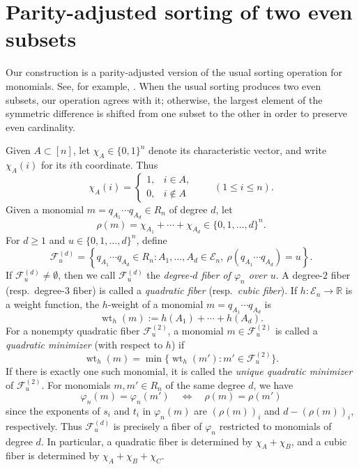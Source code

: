 \documentclass[11pt]{amsart}
\theoremstyle{definition}
\newcommand{\En}{\mathcal E_n}
\newcommand{\wt}{\operatorname{wt}}
\numberwithin{equation}{section}
\begin{document}
\section{Parity-adjusted sorting of two even subsets}

Our construction is a parity-adjusted version of the usual sorting
operation for monomials.
See, for example,
\cite[Theorem~14.2]{Sturmfels1996}.
When the usual sorting produces two even subsets, our operation agrees
with it; otherwise, the largest element of the symmetric difference is
shifted from one subset to the other in order to preserve even cardinality.

Given $A\subset[n]$, let $\chi_A\in\{0,1\}^n$ denote its
characteristic vector, and write $\chi_A(i)$ for its $i$th coordinate.
Thus
\[
 \chi_A(i)=
 \begin{cases}
 1,& i\in A,\\
 0,& i\notin A
 \end{cases}
 \qquad(1\le i\le n).
\]
Given a monomial $m=q_{A_1}\cdots q_{A_d} \in R_n$ of degree $d$, let
\[
\rho(m)=\chi_{A_1}+\cdots+\chi_{A_d}
\in\{0,1,\dots,d\}^n.
\]
For $d\ge1$ and $u\in\{0,1,\dots,d\}^n$, define
\[
\mathcal F_u^{(d)}
=
\left\{
q_{A_1}\cdots q_{A_d} \in R_n
:
A_1,\ldots,A_d\in\En,\ 
\rho(q_{A_1}\cdots q_{A_d})=u
\right\}.
\]
If $\mathcal F_u^{(d)}\neq\emptyset$, then we call
$\mathcal F_u^{(d)}$ the \emph{degree-$d$ fiber of $\varphi_n$ over $u$}.
A degree-$2$ fiber (resp.~degree-$3$ fiber) is called a
\emph{quadratic fiber} (resp.~\emph{cubic fiber}).
If $h:\En\to\mathbb R$ is a weight function, the $h$-weight of a monomial $m=q_{A_1}\cdots q_{A_d}$ is 
\[
\wt_h(m):=h(A_1)+\cdots+h(A_d).
\]
For a nonempty quadratic fiber $\mathcal F_u^{(2)}$, a monomial $m\in\mathcal F_u^{(2)}$ is called a \emph{quadratic minimizer} (with respect to $h$) if
\[
 \wt_h(m)
=
 \min\{\wt_h(m'):m'\in\mathcal F_u^{(2)}\}.
\]
If there is exactly one such monomial, it is called the \emph{unique quadratic minimizer} of $\mathcal F_u^{(2)}$.
For monomials $m,m'\in R_n$ of the same degree $d$, we have
\[
 \varphi_n(m)=\varphi_n(m')
 \quad\Longleftrightarrow\quad
 \rho(m)=\rho(m')
\]
since the exponents of $s_i$ and $t_i$ in $\varphi_n(m)$ are
$(\rho(m))_i$ and $d-(\rho(m))_i$, respectively.
Thus
$\mathcal F_u^{(d)}$ is precisely a fiber of
$\varphi_n$ restricted to monomials of degree $d$. 
In particular, a
quadratic fiber is determined by $\chi_A+\chi_B$, and a cubic fiber is determined by
$\chi_A+\chi_B+\chi_C$.
\end{document}
